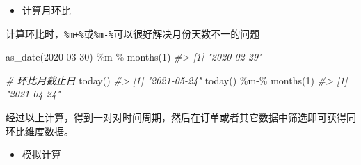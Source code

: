 \documentclass[
]{book}
\newenvironment{Shaded}{\begin{snugshade}}{\end{snugshade}}
\newcommand{\CommentTok}[1]{\textcolor[rgb]{0.56,0.35,0.01}{\textit{#1}}}
\newcommand{\DecValTok}[1]{\textcolor[rgb]{0.00,0.00,0.81}{#1}}
\newcommand{\FunctionTok}[1]{\textcolor[rgb]{0.00,0.00,0.00}{#1}}
\newcommand{\NormalTok}[1]{#1}
\newcommand{\SpecialCharTok}[1]{\textcolor[rgb]{0.00,0.00,0.00}{#1}}
\newcommand{\StringTok}[1]{\textcolor[rgb]{0.31,0.60,0.02}{#1}}
\providecommand{\tightlist}{%
  \setlength{\itemsep}{0pt}\setlength{\parskip}{0pt}}
\begin{document}
\begin{itemize}
\tightlist
\item
  计算月环比
\end{itemize}

计算环比时，\texttt{\%m+\%}或\texttt{\%m-\%}可以很好解决月份天数不一的问题

\begin{Shaded}
\begin{Highlighting}[]
\FunctionTok{as\_date}\NormalTok{(}\StringTok{\textquotesingle{}2020{-}03{-}30\textquotesingle{}}\NormalTok{) }\SpecialCharTok{\%m{-}\%} \FunctionTok{months}\NormalTok{(}\DecValTok{1}\NormalTok{)}
\CommentTok{\#\textgreater{} [1] "2020{-}02{-}29"}

\CommentTok{\# 环比月截止日}
\FunctionTok{today}\NormalTok{()}
\CommentTok{\#\textgreater{} [1] "2021{-}05{-}24"}
\FunctionTok{today}\NormalTok{() }\SpecialCharTok{\%m{-}\%} \FunctionTok{months}\NormalTok{(}\DecValTok{1}\NormalTok{)}
\CommentTok{\#\textgreater{} [1] "2021{-}04{-}24"}
\end{Highlighting}
\end{Shaded}

经过以上计算，得到一对对时间周期，然后在订单或者其它数据中筛选即可获得同环比维度数据。

\begin{itemize}
\tightlist
\item
  模拟计算
\end{itemize}
\end{document}
